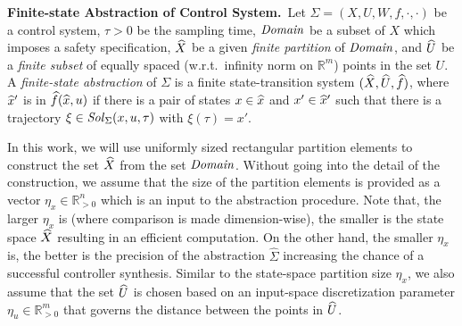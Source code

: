 \smallskip
\noindent\textbf{Finite-state Abstraction of Control System.}\
Let $\Sigma = (X, U, W, f, \cdot, \cdot)$ be a control system, $\tau>0$ be the sampling time, $\mathit{Domain}$ be a subset of $X$ which imposes a safety specification, $\widehat{X}$ be a given \emph{finite partition} of $\mathit{Domain}$, and $\widehat{U}$ be a \emph{finite subset} of equally spaced (w.r.t.\ infinity norm on $\mathbb{R}^m$) points in the set $U$.
A \emph{finite-state abstraction} of $\Sigma$ is a finite state-transition system $(\widehat{X},\widehat{U},\widehat{f})$, where $\widehat{x}'$ is in $\widehat{f}(\widehat{x},u)$ if there is a pair of states $x\in \widehat{x}$ and $x'\in \widehat{x}'$ such that there is a trajectory $\xi\in \mathit{Sol}_\Sigma(x,u,\tau)$ with $\xi(\tau)=x'$.

In this work, we will use uniformly sized rectangular partition elements to construct the set $\widehat{X}$ from the set $\mathit{Domain}$.
Without going into the detail of the construction, we assume that the size of the partition elements is provided as a vector $\eta_x\in \mathbb{R}^n_{>0}$ which is an input to the abstraction procedure.
Note that, the larger $\eta_x$ is (where comparison is made dimension-wise), the smaller is the state space $\widehat{X}$ resulting in an efficient computation.
On the other hand, the smaller $\eta_x$ is, the better is the precision of the abstraction $\widehat{\Sigma}$ increasing the chance of a successful controller synthesis. Similar to the state-space partition size $\eta_x$, we also assume that the set $\widehat{U}$ is chosen based on an input-space discretization parameter $\eta_u\in \mathbb{R}^m_{>0}$ that governs the distance between the points in $\widehat{U}$.

%

